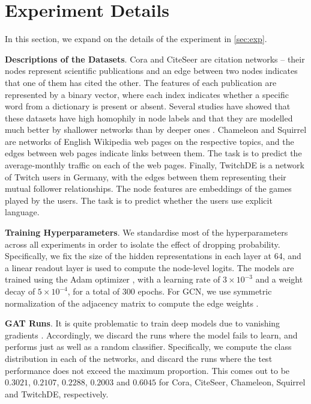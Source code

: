 \section{Experiment Details}
\label{sec:exp-setup}

In this section, we expand on the details of the experiment in \autoref{sec:exp}.

\textbf{Descriptions of the Datasets}. Cora \cite{mccallum2000cora} and CiteSeer \cite{giles1998citeseer} are citation networks -- their nodes represent scientific publications and an edge between two nodes indicates that one of them has cited the other. The features of each publication are represented by a binary vector, where each index indicates whether a specific word from a dictionary is present or absent. Several studies have showed that these datasets have high homophily in node labels \cite{lim2021new,zhu2020heterophily} and that they are modelled much better by shallower networks than by deeper ones \cite{zhou2020towards}. Chameleon and Squirrel \cite{musae} are networks of English Wikipedia web pages on the respective topics, and the edges between web pages indicate links between them. The task is to predict the average-monthly traffic on each of the web pages. Finally, TwitchDE \cite{musae} is a network of Twitch users in Germany, with the edges between them representing their mutual follower relationships. The node features are embeddings of the games played by the users. The task is to predict whether the users use explicit language.

\textbf{Training Hyperparameters}. We standardise most of the hyperparameters across all experiments in order to isolate the effect of dropping probability. Specifically, we fix the size of the hidden representations in each layer at 64, and a linear readout layer is used to compute the node-level logits. The models are trained using the Adam optimizer \cite{KingBa15}, with a learning rate of $3 \times 10^{-3}$ and a weight decay of $5 \times 10^{-4}$, for a total of 300 epochs. For GCN, we use symmetric normalization of the adjacency matrix to compute the edge weights \cite{kipf2017gcn}.

\textbf{GAT Runs}. It is quite problematic to train deep  models due to vanishing gradients \citep{dasoulas20121grad}. Accordingly, we discard the runs where the model fails to learn, and performs just as well as a random classifier. Specifically, we compute the class distribution in each of the networks, and discard the runs where the test performance does not exceed the maximum proportion. This comes out to be $0.3021$, $0.2107$, $0.2288$, $0.2003$ and $0.6045$ for Cora, CiteSeer, Chameleon, Squirrel and TwitchDE, respectively. 